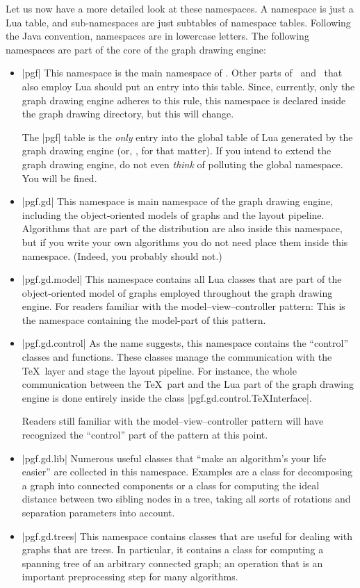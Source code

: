 Let us now have a more detailed look at these namespaces. A namespace
is just a Lua table, and sub-namespaces are just subtables of
namespace tables. Following the Java convention, namespaces are in
lowercase letters. The following namespaces are part of the core of
the graph drawing engine:
\begin{itemize}
\item |pgf| This namespace is the main namespace of \pgfname. Other
  parts of \pgfname\ and \tikzname\ that also employ Lua should put an
  entry into this table. Since, currently, only the graph drawing
  engine adheres to this rule, this namespace is declared inside the
  graph drawing directory, but this will change.

  The |pgf| table is the \emph{only} entry into the global table of
  Lua generated by the graph drawing engine (or, \pgfname, for that
  matter). If you intend to extend the graph drawing engine, do not
  even \emph{think} of polluting the global namespace. You will be
  fined.
\item |pgf.gd| This namespace is main namespace of the graph drawing
  engine, including the object-oriented models of graphs and the
  layout pipeline. Algorithms that are part of the
  distribution are also inside this namespace, but if you write your
  own algorithms you do not need place them inside this
  namespace. (Indeed, you probably should not.)
\item |pgf.gd.model| This namespace contains all Lua classes that are
  part of the object-oriented model of graphs employed
  throughout the graph drawing engine. For readers familiar with the
  model--view--controller pattern: This is the namespace containing
  the model-part of this pattern. 
\item |pgf.gd.control| As the name suggests, this namespace contains
  the ``control'' classes and functions. These classes manage the
  communication with the \TeX\ layer and stage the layout
  pipeline. For instance, the whole communication between the \TeX\
  part and the Lua part of the graph drawing engine is done entirely
  inside the class |pgf.gd.control.TeXInterface|.

  Readers still familiar with the model--view--controller pattern will
  have recognized the ``control'' part of the pattern at this point.
\item |pgf.gd.lib| Numerous useful classes that ``make an algorithm's
  your life easier'' are collected in this namespace. Examples are a
  class for decomposing a graph into connected components or a class
  for computing the ideal distance between two sibling nodes in a
  tree, taking all sorts of rotations and separation parameters into
  account. 
\item |pgf.gd.trees| This namespace contains classes that are useful
  for dealing with graphs that are trees. In particular, it contains a
  class for computing a spanning tree of an arbitrary connected graph;
  an operation that is an important preprocessing step for many
  algorithms.


\end{itemize}
